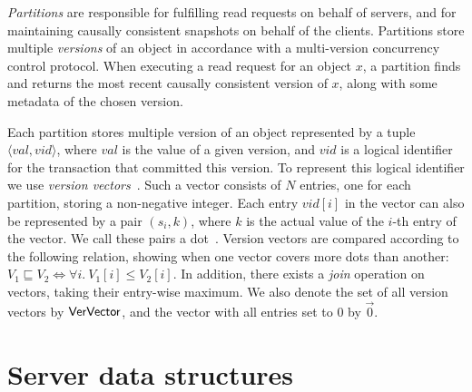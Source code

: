 \emph{Partitions} are responsible for fulfilling read requests on behalf of servers, and for maintaining causally consistent snapshots on behalf of the clients. Partitions store multiple \emph{versions} of an object in accordance with a multi-version concurrency control protocol. When executing a read request for an object $x$, a partition finds and returns the most recent causally consistent version of $x$, along with some metadata of the chosen version.

Each partition stores multiple version of an object represented by a tuple $\langle val, vid \rangle$, where $val$ is the value of a given version, and $vid$ is a logical identifier for the transaction that committed this version. To represent this logical identifier we use \emph{version vectors}~\citep{version-vectors}. Such a vector consists of $N$ entries, one for each partition, storing a non-negative integer. Each entry $vid[i]$ in the vector can also be represented by a pair $(s_i, k)$, where $k$ is the actual value of the $i$-th entry of the vector. We call these pairs a dot~\citep{carlos-causality}. Version vectors are compared according to the following relation, showing when one vector covers more dots than another: $V_1 \sqsubseteq V_2 \iff \forall i.\ V_1[i] \le V_2[i]$. In addition, there exists a \emph{join} operation on vectors, taking their entry-wise maximum.
We also denote the set of all version vectors by $\mathsf{VerVector}$, and the vector with all entries set to $0$ by $\vec{0}$.

\section{Server data structures}
\label{sect:protocol_structures}

